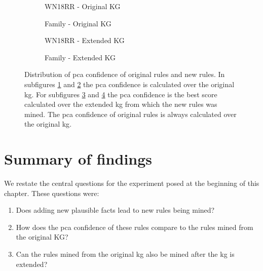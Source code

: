 \begin{figure}[htbp]
\centering
\begin{subfigure}{.49\textwidth}
  \centering
    
    \caption{WN18RR - Original KG}
  \label{fig:PCA_rule_dist_new_original_wn18rr_sub}
\end{subfigure}
\begin{subfigure}{.49\textwidth}
  \centering
    
    \caption{Family - Original KG}
  \label{fig:PCA_rule_dist_new_original_family_sub}
\end{subfigure}
\begin{subfigure}{.49\textwidth}
  \centering
    
    \caption{WN18RR - Extended KG}
  \label{fig:_PCA_rule_dist_new_original_wn18rr_sub}
\end{subfigure}%
\begin{subfigure}{.49\textwidth}
  \centering
    
    \caption{Family - Extended KG}
  \label{fig:_PCA_rule_dist_new_original_family_sub}
\end{subfigure}
\caption[PCA conf. dist. of new and original rules.]{Distribution of \gls{pca} confidence of original rules and new rules. In subfigures \ref{fig:PCA_rule_dist_new_original_wn18rr_sub} and \ref{fig:PCA_rule_dist_new_original_family_sub} the \gls{pca} confidence is calculated over the original \gls{kg}. For subfigures \ref{fig:_PCA_rule_dist_new_original_wn18rr_sub} and \ref{fig:_PCA_rule_dist_new_original_family_sub} the \gls{pca} confidence is the best score calculated over the extended \gls{kg} from which the new rules was mined. The \gls{pca} confidence of original rules is always calculated over the original \gls{kg}.}
\label{fig:PCA_rule_dist_new_original}
\end{figure}


\section{Summary of findings}
\label{results_summary}
We restate the central questions for the experiment posed at the beginning of this chapter. These questions were:
\begin{enumerate}
    \item Does adding new plausible facts lead to new rules being mined? 
    \item How does the \gls{pca} confidence of these rules compare to the rules mined from the original KG?
    \item Can the rules mined from the original \gls{kg} also be mined after the \gls{kg} is extended?
\end{enumerate}

